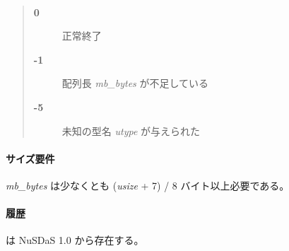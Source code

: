 \paragraph{\ResultCode}
\begin{quote}
\begin{description}
\item[{\bf 0}] 正常終了
\item[{\bf -1}] 配列長 {\it mb\_bytes} が不足している
\item[{\bf -5}] 未知の型名 {\it utype} が与えられた
\end{description}\end{quote}

\paragraph{サイズ要件}
{\it mb\_bytes} は少なくとも ({\it usize} + 7) / 8 バイト以上必要である。

\paragraph{履歴}
 は NuSDaS 1.0 から存在する。
